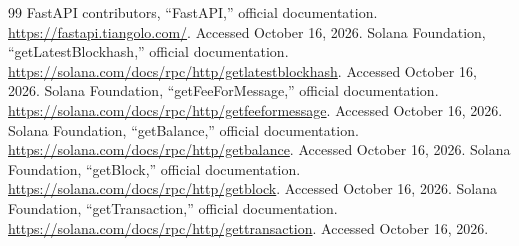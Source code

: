 \documentclass[12pt,a4paper,oneside]{report}
\begin{document}
\begin{thebibliography}{99}
 FastAPI contributors, ``FastAPI,'' official documentation. \url{https://fastapi.tiangolo.com/}. Accessed October 16, 2026.
 Solana Foundation, ``getLatestBlockhash,'' official documentation. \url{https://solana.com/docs/rpc/http/getlatestblockhash}. Accessed October 16, 2026.
 Solana Foundation, ``getFeeForMessage,'' official documentation. \url{https://solana.com/docs/rpc/http/getfeeformessage}. Accessed October 16, 2026.
 Solana Foundation, ``getBalance,'' official documentation. \url{https://solana.com/docs/rpc/http/getbalance}. Accessed October 16, 2026.
 Solana Foundation, ``getBlock,'' official documentation. \url{https://solana.com/docs/rpc/http/getblock}. Accessed October 16, 2026.
 Solana Foundation, ``getTransaction,'' official documentation. \url{https://solana.com/docs/rpc/http/gettransaction}. Accessed October 16, 2026.
\end{thebibliography}
\end{document}
